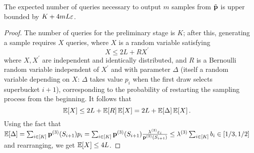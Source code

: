 \begin{claim}\label{lemma:correct:waterfill:queries}
The expected number of queries necessary to output $m$ samples from $\tilde{\mathbf{p}}$ is upper bounded by $K + 4mL\varepsilon$.
\end{claim}
\begin{proof}
The number of queries for the preliminary stage is $K$; after this, generating a sample requires $X$ queries, where $X$ is a random variable satisfying
\[
X \leq 2L + RX^\prime
\]
where $X,X^\prime$ are independent and identically distributed, and $R$ is a Bernoulli random variable independent of $X^\prime$ and with parameter $\Delta$ (itself a random variable depending on $X$: $\Delta$ takes value $p_i$ when the first draw selects superbucket $i+1$), corresponding to the probability of restarting the sampling process from the beginning. It follows that
\[
\mathbb{E}\!\left[X\right] \leq 2L + \mathbb{E}\!\left[R\right]\mathbb{E}\!\left[X\right] = 2L + \mathbb{E}\!\left[\Delta\right]\mathbb{E}\!\left[X\right].
\]
Using the fact that $\mathbb{E}\!\left[\Delta\right]=\sum_{i\in[K]} \mathbf{p}^{(3)}(S_{i+1}) p_i = \sum_{i\in[K]} \mathbf{p}^{(3)}(S_{i+1})  \frac{\lambda^{(3)}\varepsilon_i}{\mathbf{p}^{(3)}(S_{i+1})} \leq \lambda^{(3)}\sum_{i\in[K]} b_i \in[1/3,1/2]$ 
and rearranging, we get $\mathbb{E}\!\left[X\right]\leq 4L$.
\end{proof}

